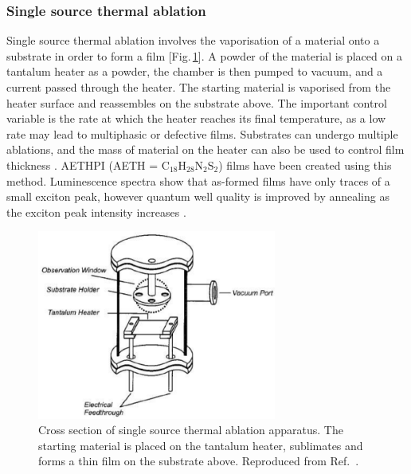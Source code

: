 \subsubsection{Single source thermal ablation}
Single source thermal ablation involves the vaporisation of a material onto a substrate in order to form a film [Fig.\,\ref{2Fig9}]. A powder of the material is placed on a tantalum heater as a powder, the chamber is then pumped to vacuum, and a current passed through the heater. The starting material is vaporised from the heater surface and reassembles on the substrate above. The important control variable is the rate at which the heater reaches its final temperature, as a low rate may lead to multiphasic or defective films. Substrates can undergo multiple ablations, and the mass of material on the heater can also be used to control film thickness \cite{Mitzi1999}. AETHPI (AETH = $\textrm{C}_{18}\textrm{H}_{28}\textrm{N}_2\textrm{S}_2$) films have been created using this method. Luminescence spectra show that as-formed films have only traces of a small exciton peak, however quantum well quality is improved by annealing as the exciton peak intensity increases \cite{Chondroudis2000}.
\begin{figure} [h!]
\centering
\includegraphics[width=0.7\textwidth]{Fig9}
\caption{Cross section of single source thermal ablation apparatus. The starting material is placed on the tantalum heater, sublimates and forms a thin film on the substrate above. Reproduced from Ref.\ \cite{Chondroudis2000}.}
\label{2Fig9}
\end{figure}

